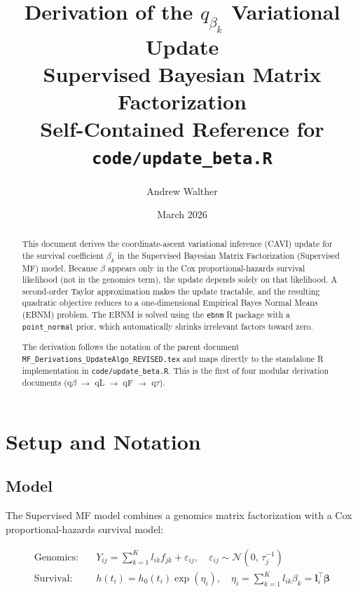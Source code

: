 \documentclass[11pt]{article}
\title{\textbf{Derivation of the $q_{\beta_k}$ Variational Update}\\[4pt]
       \large Supervised Bayesian Matrix Factorization\\[4pt]
       \normalsize Self-Contained Reference for \texttt{code/update\_beta.R}}
\author{Andrew Walther}
\date{March 2026}
\begin{document}
\maketitle

\begin{abstract}
This document derives the coordinate-ascent variational inference (CAVI)
update for the survival coefficient $\beta_k$ in the Supervised Bayesian
Matrix Factorization (Supervised MF) model.  Because $\beta$ appears only
in the Cox proportional-hazards survival likelihood (not in the genomics
term), the update depends solely on that likelihood.  A second-order Taylor
approximation makes the update tractable, and the resulting quadratic
objective reduces to a one-dimensional Empirical Bayes Normal Means (EBNM)
problem.  The EBNM is solved using the \texttt{ebnm} R package with a
\texttt{point\_normal} prior, which automatically shrinks irrelevant factors
toward zero.

The derivation follows the notation of the parent document
\texttt{MF\_Derivations\_UpdateAlgo\_REVISED.tex} and maps directly to the
standalone R implementation in \texttt{code/update\_beta.R}.  This is the
first of four modular derivation documents (q$\beta$ $\to$ qL $\to$ qF
$\to$ q$\tau$).
\end{abstract}

\tableofcontents
\newpage

\section{Setup and Notation}\label{sec:setup}

\subsection{Model}

The Supervised MF model combines a genomics matrix factorization with a Cox
proportional-hazards survival model:

\begin{align}
  \text{Genomics:}\quad &
  Y_{ij} = \sum_{k=1}^K l_{ik} f_{jk} + \varepsilon_{ij},
  \quad \varepsilon_{ij} \sim \mathcal{N}(0,\,\tau_j^{-1})
  \label{eq:genomics} \\[4pt]
  \text{Survival:}\quad &
  h(t_i) = h_0(t_i)\exp\!\left(\eta_i\right),
  \quad \eta_i = \sum_{k=1}^K l_{ik}\beta_k = \bm{l}_i^\top\bm{\beta}
  \label{eq:survival}
\end{align}
\end{document}
